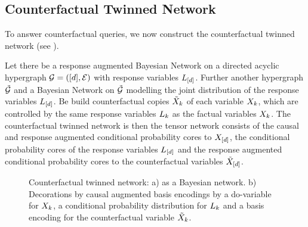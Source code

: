 

\subsection{Counterfactual Twinned Network}

To answer counterfactual queries, we now construct the counterfactual twinned network (see ).

\begin{definition}
    Let there be a response augmented Bayesian Network on a directed acyclic hypergraph $\mathcal{G}=([d],\mathcal{E})$ with response variables $L_{[d]}$.
    Further another hypergraph $\tilde{\mathcal{G}}$ and a Bayesian Network on $\tilde{\mathcal{G}}$ modelling the joint distribution of the response variables $L_{[d]}$.
    Be build counterfactual copies $\tilde{X}_{k}$ of each variable $X_{k}$, which are controlled by the same response variables $L_{k}$ as the factual variables $X_{k}$.
    The counterfactual twinned network is then the tensor network consists of the causal and response augmented conditional probability cores to $X_{[d]}$, the conditional probability cores of the response variables $L_{[d]}$ and the response augmented conditional probability cores to the counterfactual variables $\tilde{X}_{[d]}$.
\end{definition}


\begin{figure}[t]
    
    \caption{Counterfactual twinned network: a) as a Bayesian network.
    b) Decorations by causal augmented basis encodings by a do-variable for $X_{k}$, a conditional probability distribution for $L_{k}$ and a basis encoding for the counterfactual variable $\tilde{X}_{k}$.}
    \label{fig:counterfactualTwinnedNetwork}
\end{figure}

